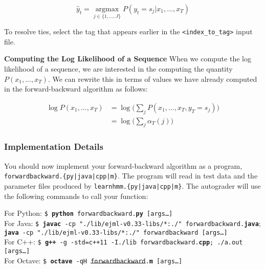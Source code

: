 \documentclass[11pt,addpoints,answers]{exam}
\numberwithin{equation}{section} %
\numberwithin{figure}{section} %
\numberwithin{table}{section} %
\newcommand \argmax {\operatorname*{argmax}}
\providecommand{\DIFaddtex}[1]{{\protect\color{blue}\uwave{#1}}} %
\providecommand{\DIFdeltex}[1]{{\protect\color{red}\sout{#1}}}                      %
\providecommand{\DIFaddbegin}{} %
\providecommand{\DIFaddend}{} %
\providecommand{\DIFdelbegin}{} %
\providecommand{\DIFdelend}{} %
\providecommand{\DIFadd}[1]{\texorpdfstring{\DIFaddtex{#1}}{#1}} %
\providecommand{\DIFdel}[1]{\texorpdfstring{\DIFdeltex{#1}}{}} %
\newcommand{\DIFscaledelfig}{0.5}
\newlength{\DIFdelgraphicswidth} %
\newlength{\DIFdelgraphicsheight} %
\newcommand{\DIFaddincludegraphics}[2][]{{\color{blue}\fbox{\DIFOincludegraphics[#1]{#2}}}} %
\newcommand{\DIFdelincludegraphics}[2][]{%
\sbox{\DIFdelgraphicsbox}{\DIFOincludegraphics[#1]{#2}}%
\settoboxwidth{\DIFdelgraphicswidth}{\DIFdelgraphicsbox} %
\settoboxtotalheight{\DIFdelgraphicsheight}{\DIFdelgraphicsbox} %
\scalebox{\DIFscaledelfig}{%
\parbox[b]{\DIFdelgraphicswidth}{\usebox{\DIFdelgraphicsbox}\\[-\baselineskip] \rule{\DIFdelgraphicswidth}{0em}}\llap{\resizebox{\DIFdelgraphicswidth}{\DIFdelgraphicsheight}{%
\setlength{\unitlength}{\DIFdelgraphicswidth}%
\begin{picture}(1,1)%
\thicklines\linethickness{2pt} %
{\color[rgb]{1,0,0}\put(0,0){\framebox(1,1){}}}%
{\color[rgb]{1,0,0}\put(0,0){\line( 1,1){1}}}%
{\color[rgb]{1,0,0}\put(0,1){\line(1,-1){1}}}%
\end{picture}%
}\hspace*{3pt}}} %
} %
\DeclareRobustCommand{\DIFaddbegin}{\DIFOaddbegin \let\includegraphics\DIFaddincludegraphics} %
\DeclareRobustCommand{\DIFaddend}{\DIFOaddend \let\includegraphics\DIFOincludegraphics} %
\DeclareRobustCommand{\DIFdelbegin}{\DIFOdelbegin \let\includegraphics\DIFdelincludegraphics} %
\DeclareRobustCommand{\DIFdelend}{\DIFOaddend \let\includegraphics\DIFOincludegraphics} %
\begin{document}
$$\hat{y}_t = \argmax_{j\in \{1,...,J\}} P(y_t = s_j\vert x_1,...,x_T)$$

To resolve ties, select the tag that appears earlier in the \texttt{<index\_to\_tag>} input file.

\textbf{Computing the Log Likelihood of a Sequence}
When we compute the log likelihood of a sequence, we are interested in the computing the quantity $P(x_1,...,x_T)$. We can rewrite this in terms of values we have already computed in the forward-backward algorithm as follows:

\begin{align*}
    \log P(x_1,...,x_T) &= \log\big(\sum_j P(x_1,...,x_T,y_T=s_j)\big)\\
    &= \log\big(\sum_j \alpha_T(j)\big)
\end{align*}

\subsubsection{Implementation Details}

You should now implement your forward-backward algorithm as a program, \texttt{forwardbackward.\{py|java|cpp|m\}}. The program will read in test data and the parameter files produced by \texttt{learnhmm.\{py|java|cpp|m\}}. The autograder will use the following commands to call your function:

\begin{tabbing}
For Python: \=\texttt{\$ \textbf{python} forwardbackward.\textbf{py} [args\dots]}\\
For Java: \>\texttt{\$ \textbf{javac} -cp "./lib/ejml-v0.33-libs/*:./" forwardbackward.\textbf{java}\DIFaddbegin }\DIFaddend ;\\ 
          \>\texttt{\textbf{java} -cp "./lib/ejml-v0.33-libs/*:./" forwardbackward [args\dots]}\DIFdelbegin %
\DIFdelend \\
For C++: \>\texttt{\$ \textbf{g++} -g -std=c++11 -I./lib forwardbackward.\textbf{cpp}; ./a.out [args\dots]}\\
For Octave: \>\texttt{\$ \textbf{octave} -qH \DIFdelbegin \DIFdel{forwardbackward}\DIFdelend \DIFaddbegin \DIFadd{forwardBackward}\DIFaddend .\textbf{m} [args\dots]}
\end{tabbing}
\end{document}

